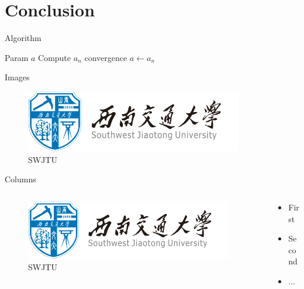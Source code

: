 \documentclass[11pt]{SWJTUBeamer}
\begin{document}
\section{Conclusion}

\begin{frame}{Algorithm}
    \begin{algorithm2e}[H]
        \caption{Algorithm 1}\label{alg:em}
        \begin{algorithmic}[1]
            \REQUIRE Param
            \ENSURE $a$
            \REPEAT
            \STATE Compute $a_n$
            \UNTIL convergence
            \RETURN $a\leftarrow a_n$
        \end{algorithmic}
    \end{algorithm2e}
\end{frame}

\begin{frame}{Images}
    \begin{figure}
        \centering
        \includegraphics[width=0.85\textwidth]{swjtu_logo.png}
        \caption{SWJTU}\label{fig:jtu}
    \end{figure}
\end{frame}

\begin{frame}{Columns}
    \begin{columns}
        \begin{column}{0.45\textwidth}
            \begin{figure}
                \centering
                \includegraphics[width=0.95\textwidth]{swjtu_logo.png}
                \caption{SWJTU}\label{fig:SWJTU}
            \end{figure}
        \end{column}
        \begin{column}{0.55\textwidth}
            \begin{itemize}
                \item First
                \item Second
                \item ...
            \end{itemize}
        \end{column}
    \end{columns}
\end{frame}
\end{document}
